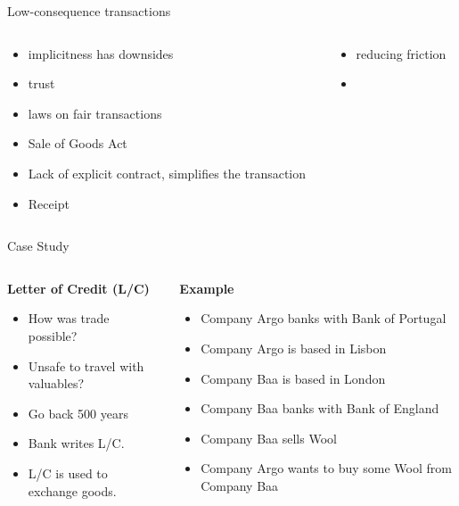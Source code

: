 \documentclass[pdf,table]{beamer}
\begin{document}
\begin{frame}{Low-consequence transactions}
	\begin{columns}[T]
		\begin{column}{0.48\textwidth}
			\begin{itemize}
				\item implicitness has downsides %
				\item trust
				\item laws on fair transactions
				\item Sale of Goods Act
				\item Lack of explicit contract, simplifies the transaction
				\item Receipt
			\end{itemize}
		\end{column}
		\begin{column}{0.48\textwidth}
			\begin{itemize}
				\item reducing friction
				\item 
			\end{itemize}
		\end{column}
	\end{columns}	
\end{frame}



\begin{frame}{Case Study}
	\begin{columns}[T]
		\begin{column}{0.48\textwidth}
			{\bf Letter of Credit (L/C)}
			\begin{itemize}
				\item How was trade possible?
				\item Unsafe to travel with valuables?
				\item Go back 500 years
				\item Bank writes L/C.
				\item L/C is used to exchange goods.
			\end{itemize}
		\end{column}
		\begin{column}{0.48\textwidth}
			{\bf Example}
			\begin{itemize}
				\item Company Argo banks with Bank of Portugal 
				\item Company Argo is based in Lisbon 
				\item Company Baa is based in London
				\item Company Baa banks with Bank of England
				\item Company Baa sells Wool
				\item Company Argo wants to buy some Wool from Company Baa 
			\end{itemize}
		\end{column}
	\end{columns}	
\end{frame}
\end{document}
